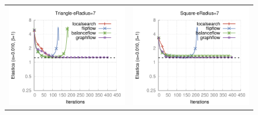 \begin{figure}
\begin{tabular}{cc}
\includegraphics[scale=0.45]{figures/chapter9/free-elastica/plots/iteration/main_experiment/len_pen_0.01/radius-7/triangle.pdf} &
\includegraphics[scale=0.45]{figures/chapter9/free-elastica/plots/iteration/main_experiment/len_pen_0.01/radius-7/square.pdf}\\[1em]

\end{tabular}
\end{figure}
